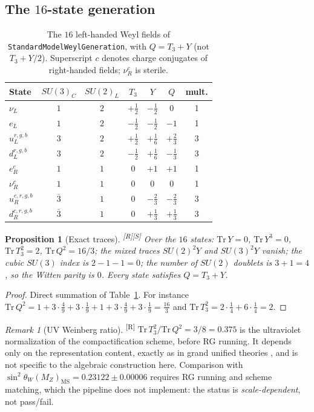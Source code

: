 \documentclass[11pt,a4paper]{article}
\newtheorem{proposition}[theorem]{Proposition}
\theoremstyle{definition}
\theoremstyle{remark}
\newtheorem{remark}[theorem]{Remark}
\newcommand{\code}[1]{\texttt{#1}}
\newcommand{\tR}{\textsuperscript{[R]}}
\newcommand{\tS}{\textsuperscript{[S]}}
\begin{document}
\subsection{The $16$-state generation}
\begin{table}[!htbp]
\centering\small
\begin{tabular}{@{}lcccccc@{}}
\toprule
State & $SU(3)_C$ & $SU(2)_L$ & $T_3$ & $Y$ & $Q$ & mult.\\
\midrule
$\nu_L$ & $1$ & $2$ & $+\tfrac12$ & $-\tfrac12$ & $0$ & 1\\
$e_L$ & $1$ & $2$ & $-\tfrac12$ & $-\tfrac12$ & $-1$ & 1\\
$u_L^{r,g,b}$ & $3$ & $2$ & $+\tfrac12$ & $+\tfrac16$ & $+\tfrac23$ & 3\\
$d_L^{r,g,b}$ & $3$ & $2$ & $-\tfrac12$ & $+\tfrac16$ & $-\tfrac13$ & 3\\
$e_R^{c}$ & $1$ & $1$ & $0$ & $+1$ & $+1$ & 1\\
$\nu_R^{c}$ & $1$ & $1$ & $0$ & $0$ & $0$ & 1\\
$u_R^{c,r,g,b}$ & $\bar 3$ & $1$ & $0$ & $-\tfrac23$ & $-\tfrac23$ & 3\\
$d_R^{c,r,g,b}$ & $\bar 3$ & $1$ & $0$ & $+\tfrac13$ & $+\tfrac13$ & 3\\
\bottomrule
\end{tabular}
\caption{The $16$ left-handed Weyl fields of \code{StandardModelWeylGeneration}, with $Q=T_3+Y$ (not $T_3+Y/2$). Superscript $c$ denotes charge conjugates of right-handed fields; $\nu_R^c$ is sterile.}\label{tab:weyl}
\end{table}
\begin{proposition}[Exact traces]\label{prop:anom}\tR\tS
Over the $16$ states: $\mathrm{Tr}\,Y=0$, $\mathrm{Tr}\,Y^3=0$, $\mathrm{Tr}\,T_3^2=2$, $\mathrm{Tr}\,Q^2=16/3$; the mixed traces $SU(2)^2Y$ and $SU(3)^2Y$ vanish; the cubic $SU(3)$ index is $2-1-1=0$; the number of $SU(2)$ doublets is $3+1=4$, so the Witten parity is $0$. Every state satisfies $Q=T_3+Y$.
\end{proposition}
\begin{proof}
Direct summation of Table~\ref{tab:weyl}. For instance $\mathrm{Tr}\,Q^2=1+3\cdot\tfrac49+3\cdot\tfrac19+1+3\cdot\tfrac49+3\cdot\tfrac19=\tfrac{16}{3}$ and $\mathrm{Tr}\,T_3^2=2\cdot\tfrac14+6\cdot\tfrac14=2$.
\end{proof}
\begin{remark}[UV Weinberg ratio]\label{rem:ratio}\tR
$\mathrm{Tr}\,T_3^2/\mathrm{Tr}\,Q^2=3/8=0.375$ is the ultraviolet normalization of the compactification scheme, before RG running. It depends only on the representation content, exactly as in grand unified theories \cite{GeorgiGlashow}, and is not specific to the algebraic construction here. Comparison with $\sin^2\theta_W(M_Z)_{\overline{\mathrm{MS}}}=0.23122\pm0.00006$ requires RG running and scheme matching, which the pipeline does not implement: the status is \emph{scale-dependent}, not pass/fail.
\end{remark}
\end{document}
